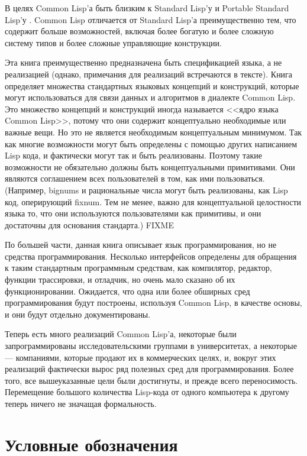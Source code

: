 В целях Common Lisp'а быть близким к Standard Lisp'у \cite{STANDARD-LISP-REPORT}
и Portable Standard Lisp'у \cite{PSL-MANUAL}. Common Lisp отличается от Standard
Lisp'а преимущественно тем, что содержит больше возможностей, включая более
богатую и более сложную систему типов и более сложные управляющие конструкции. 

Эта книга преимущественно предназначена быть спецификацией языка, а не
реализацией (однако, примечания для реализаций встречаются в тексте).
Книга определяет множества стандартных языковых концепций и конструкций, которые
могут использоваться для связи данных и алгоритмов в диалекте Common Lisp. Это
множество концепций и конструкций иногда называется <<ядро языка Common
Lisp>>, потому что они содержит концептуально необходимые или важные вещи. Но
это не является необходимым концептуальным минимумом. Так как многие возможности
могут быть определены с помощью других написанием Lisp кода, и фактически могут
так и быть реализованы. Поэтому такие возможности не обязательно должны быть
концептуальными примитивами. Они являются соглашением всех пользователей в том,
как ими пользоваться. (Например, bignums и рациональные числа могут быть
реализованы, как Lisp код, оперирующий fixnum. Тем не менее, важно для
концептуальной целостности языка то, что они используются пользователями как
примитивы, и они достаточны для основания стандарта.) FIXME

По большей части, данная книга описывает язык программирования, но не средства
программирования. Несколько интерфейсов определены для обращения к таким
стандартным программным средствам, как компилятор, редактор, функции
трассировки, и отладчик, но очень мало сказано об их
функционировании. Ожидается, что одна или более обширных сред программирования
будут построены, используя Common Lisp, в качестве основы, и они будут отдельно
документированы. 

\begin{newer}
Теперь есть много реализаций Common Lisp'а, некоторые были запрограммированы
исследовательскими группами в университетах, а некоторые --- компаниями, которые
продают их в коммерческих целях, и, вокруг
этих реализаций фактически вырос ряд полезных сред для программирования.
Более того, все вышеуказанные цели были достигнуты, и прежде всего
переносимость. Перемещение большого количества Lisp-кода от одного компьютера к
другому теперь ничего не значащая формальность.  
\end{newer}

\section{Условные обозначения}

